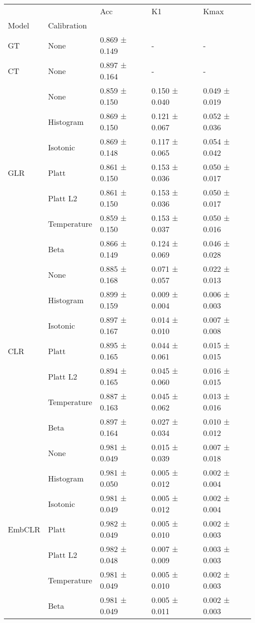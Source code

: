 \begin{tabular}{lllll}
\toprule
 &  & Acc & K1 & Kmax \\
Model & Calibration &  &  &  \\
\midrule
GT & None & 0.869 ± 0.149 & - & - \\
\cline{1-5}
CT & None & 0.897 ± 0.164 & - & - \\
\cline{1-5}
\multirow[t]{7}{*}{GLR} & None & 0.859 ± 0.150 & 0.150 ± 0.040 & 0.049 ± 0.019 \\
 & Histogram & 0.869 ± 0.150 & 0.121 ± 0.067 & 0.052 ± 0.036 \\
 & Isotonic & 0.869 ± 0.148 & 0.117 ± 0.065 & 0.054 ± 0.042 \\
 & Platt & 0.861 ± 0.150 & 0.153 ± 0.036 & 0.050 ± 0.017 \\
 & Platt L2 & 0.861 ± 0.150 & 0.153 ± 0.036 & 0.050 ± 0.017 \\
 & Temperature & 0.859 ± 0.150 & 0.153 ± 0.037 & 0.050 ± 0.016 \\
 & Beta & 0.866 ± 0.149 & 0.124 ± 0.069 & 0.046 ± 0.028 \\
\cline{1-5}
\multirow[t]{7}{*}{CLR} & None & 0.885 ± 0.168 & 0.071 ± 0.057 & 0.022 ± 0.013 \\
 & Histogram & 0.899 ± 0.159 & 0.009 ± 0.004 & 0.006 ± 0.003 \\
 & Isotonic & 0.897 ± 0.167 & 0.014 ± 0.010 & 0.007 ± 0.008 \\
 & Platt & 0.895 ± 0.165 & 0.044 ± 0.061 & 0.015 ± 0.015 \\
 & Platt L2 & 0.894 ± 0.165 & 0.045 ± 0.060 & 0.016 ± 0.015 \\
 & Temperature & 0.887 ± 0.163 & 0.045 ± 0.062 & 0.013 ± 0.016 \\
 & Beta & 0.897 ± 0.164 & 0.027 ± 0.034 & 0.010 ± 0.012 \\
\cline{1-5}
\multirow[t]{7}{*}{EmbCLR} & None & 0.981 ± 0.049 & 0.015 ± 0.039 & 0.007 ± 0.018 \\
 & Histogram & 0.981 ± 0.050 & 0.005 ± 0.012 & 0.002 ± 0.004 \\
 & Isotonic & 0.981 ± 0.049 & 0.005 ± 0.012 & 0.002 ± 0.004 \\
 & Platt & 0.982 ± 0.049 & 0.005 ± 0.010 & 0.002 ± 0.003 \\
 & Platt L2 & 0.982 ± 0.048 & 0.007 ± 0.009 & 0.003 ± 0.003 \\
 & Temperature & 0.981 ± 0.049 & 0.005 ± 0.010 & 0.002 ± 0.003 \\
 & Beta & 0.981 ± 0.049 & 0.005 ± 0.011 & 0.002 ± 0.003 \\
\cline{1-5}
\bottomrule
\end{tabular}
